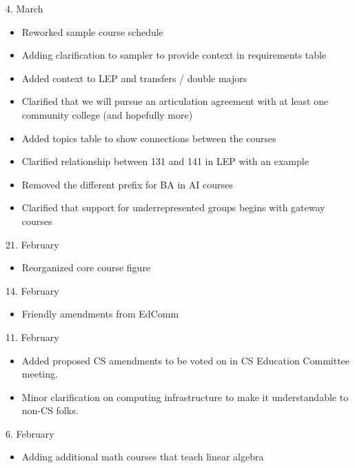 


4. March

\begin{itemize}
      \item Reworked sample course schedule
  \item Adding clarification to sampler to provide context in
    requirements table
  \item Added context to LEP and transfers / double majors
    \item Clarified that we will pursue an articulation agreement with
      at least one community college (and hopefully more)
    \item Added topics table to show connections between the courses
      \item Clarified relationship between 131 and 141 in LEP with an
        example
      \item Removed the different prefix for BA in AI courses
        \item Clarified that support for underrepresented groups
          begins with gateway courses
\end{itemize}

21. February

\begin{itemize}
  \item Reorganized core course figure
\end{itemize}

14. February

\begin{itemize}
    \item Friendly amendments from EdComm
\end{itemize}

11. February

\begin{itemize}
    \item Added proposed CS amendments to be voted on in CS Education Committee meeting.
    \item Minor clarification on computing infrastructure to make it understandable to non-CS folks.
\end{itemize}

6. February
\begin{itemize}
  \item Adding additional math courses that teach linear algebra
\end{itemize}


